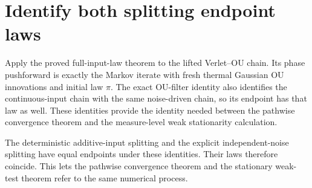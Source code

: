 \documentclass[11pt,a4paper]{article}
\begin{document}
\section{\texorpdfstring{Identify both splitting endpoint laws}{Identify both splitting endpoint laws}}


Apply the proved full-input-law theorem to the lifted Verlet–OU chain. Its phase pushforward is exactly the Markov iterate with fresh thermal Gaussian OU innovations and initial law \(\pi\). The exact OU-filter identity also identifies the continuous-input chain with the same noise-driven chain, so its endpoint has that law as well. These identities provide the identity needed between the pathwise convergence theorem and the measure-level weak stationarity calculation.



The deterministic additive-input splitting and the explicit independent-noise splitting have equal endpoints under these identities. Their laws therefore coincide. This lets the pathwise convergence theorem and the stationary weak-test theorem refer to the same numerical process.
\end{document}
